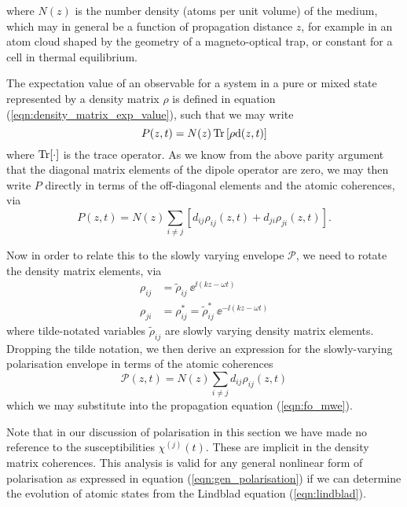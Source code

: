     where $N(z)$ is the number density (atoms per unit volume) of the medium,
    which may in general be a function of propagation distance $z$, for example
    in an atom cloud shaped by the geometry of a magneto-optical
    trap\cite{Adams1997}, or constant for a cell in thermal equilibrium.

    The expectation value of an observable for a system in a pure or mixed state
    represented by a density matrix $\rho$ is defined in equation
    (\ref{eqn:density_matrix_exp_value}), such that we may write
    \begin{equation}
      P(z,t) = N(z) \operatorname{Tr}{ \left[ \rho \mathrm{d}(z,t) \right] }
    \end{equation}
    where $\operatorname{Tr}[\cdot]$ is the trace operator. As we know from the above parity argument
    that the diagonal matrix elements of the dipole operator are zero, we may
    then write $P$ directly in terms of the off-diagonal elements and the atomic
    coherences, via
    \begin{equation}
      P(z,t) = N(z) \sum_{i \ne j}{\left[ d_{ij} \rho_{ij}(z,t) + 
                                 d_{ji} \rho_{ji}(z,t) \right] }.
    \end{equation}

    Now in order to relate this to the slowly varying envelope $\mathcal{P}$, we
    need to rotate the density matrix elements, via
    \begin{align*}
      \rho_{ij} &= \tilde{\rho}_{ij} ~ \ee^{\ii (k z - \omega t)} \\
      \rho_{ji} &= \rho^*_{ij} = \tilde{\rho}^*_{ij} ~ \ee^{-\ii (k z - \omega t)}
    \end{align*}
    where tilde-notated variables $\tilde{\rho}_{ij}$ are slowly varying density
    matrix elements. Dropping the tilde notation, we then derive an expression
    for the slowly-varying polarisation envelope in terms of the atomic
    coherences
    \begin{equation} 
      \mathcal{P}(z,t) = N(z) \sum_{i \ne j} d_{ij} \rho_{ij}(z,t)
      \label{eqn:polarisation_coherences}
    \end{equation} 
    which we may substitute into the propagation equation
    (\ref{eqn:fo_mwe}).

    Note that in our discussion of polarisation in this section we have made no
    reference to the susceptibilities $\chi^{(j)}(t)$. These are implicit in the
    density matrix coherences. This analysis is valid for any general nonlinear
    form of polarisation as expressed in equation (\ref{eqn:gen_polarisation})
    if we can determine the evolution of atomic states from the Lindblad
    equation (\ref{eqn:lindblad}). 

